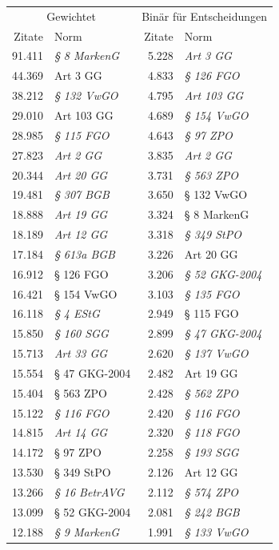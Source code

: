 \begin{tabular}{rl|rl}
\multicolumn{2}{c}{Gewichtet} & \multicolumn{2}{|c}{Binär für Entscheidungen} \\
Zitate & Norm & Zitate & Norm \\
\midrule
91.411 & \emph{§ 8 MarkenG} & 5.228 & \emph{Art 3 GG} \\
44.369 & Art 3 GG & 4.833 & \emph{§ 126 FGO} \\
38.212 & \emph{§ 132 VwGO} & 4.795 & \emph{Art 103 GG} \\
29.010 & Art 103 GG & 4.689 & \emph{§ 154 VwGO} \\
28.985 & \emph{§ 115 FGO} & 4.643 & \emph{§ 97 ZPO} \\
27.823 & \emph{Art 2 GG} & 3.835 & \emph{Art 2 GG} \\
20.344 & \emph{Art 20 GG} & 3.731 & \emph{§ 563 ZPO} \\
19.481 & \emph{§ 307 BGB} & 3.650 & § 132 VwGO \\
18.888 & \emph{Art 19 GG} & 3.324 & § 8 MarkenG \\
18.189 & \emph{Art 12 GG} & 3.318 & \emph{§ 349 StPO} \\
17.184 & \emph{§ 613a BGB} & 3.226 & Art 20 GG \\
16.912 & § 126 FGO & 3.206 & \emph{§ 52 GKG-2004} \\
16.421 & § 154 VwGO & 3.103 & \emph{§ 135 FGO} \\
16.118 & \emph{§ 4 EStG} & 2.949 & § 115 FGO \\
15.850 & \emph{§ 160 SGG} & 2.899 & \emph{§ 47 GKG-2004} \\
15.713 & \emph{Art 33 GG} & 2.620 & \emph{§ 137 VwGO} \\
15.554 & § 47 GKG-2004 & 2.482 & Art 19 GG \\
15.404 & § 563 ZPO & 2.428 & \emph{§ 562 ZPO} \\
15.122 & \emph{§ 116 FGO} & 2.420 & \emph{§ 116 FGO} \\
14.815 & \emph{Art 14 GG} & 2.320 & \emph{§ 118 FGO} \\
14.172 & § 97 ZPO & 2.258 & \emph{§ 193 SGG} \\
13.530 & § 349 StPO & 2.126 & Art 12 GG \\
13.266 & \emph{§ 16 BetrAVG} & 2.112 & \emph{§ 574 ZPO} \\
13.099 & § 52 GKG-2004 & 2.081 & \emph{§ 242 BGB} \\
12.188 & \emph{§ 9 MarkenG} & 1.991 & \emph{§ 133 VwGO} \\
\end{tabular}
